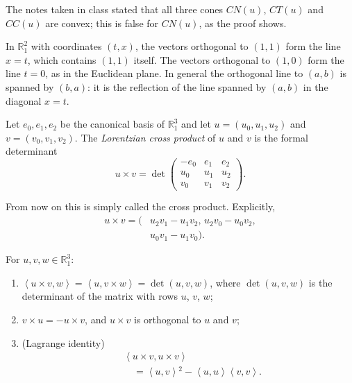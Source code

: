 The notes taken in class stated that all
three cones $CN(u)$, $CT(u)$ and $CC(u)$
are convex; this is false for $CN(u)$, as
the proof shows.

\begin{example}
\label{example-palmas-orthogonal-plane}
In $\mathbb{R}^2_1$ with coordinates
$(t,x)$, the vectors orthogonal to
$(1,1)$ form the line $x=t$, which
contains $(1,1)$ itself. The vectors
orthogonal to $(1,0)$ form the line $t=0$,
as in the Euclidean plane. In general the
orthogonal line to $(a,b)$ is spanned by
$(b,a)$: it is the reflection of the line
spanned by $(a,b)$ in the diagonal $x=t$.
\end{example}

\begin{definition}
\label{definition-palmas-cross-product}
Let $e_0,e_1,e_2$ be the canonical basis of
$\mathbb{R}^3_1$ and let
$u=(u_0,u_1,u_2)$ and $v=(v_0,v_1,v_2)$.
The \emph{Lorentzian cross product} of $u$
and $v$ is the formal determinant
$$
u\times v=\det
\begin{pmatrix}
-e_0 & e_1 & e_2\\
u_0 & u_1 & u_2\\
v_0 & v_1 & v_2
\end{pmatrix}.
$$
\end{definition}

From now on this is simply called the
cross product. Explicitly,
$$
\begin{aligned}
u\times v=\big(
&u_2v_1-u_1v_2,\,
u_2v_0-u_0v_2,\\
&u_0v_1-u_1v_0\big).
\end{aligned}
$$

\begin{proposition}
\label{proposition-palmas-cross-product}
For $u,v,w\in\mathbb{R}^3_1$:
\begin{enumerate}
\item
$\left\langle{} u\times v,w \right\rangle{}
=\left\langle{} u,v\times w \right\rangle{}
=\det(u,v,w)$, where $\det(u,v,w)$ is the
determinant of the matrix with rows $u$,
$v$, $w$;
\item $v\times u=-u\times v$, and
$u\times v$ is orthogonal to $u$ and $v$;
\item (Lagrange identity)
$$
\begin{aligned}
&\left\langle{} u\times v,u\times v
\right\rangle{}\\
&\quad=\left\langle{} u,v \right\rangle{}^2
-\left\langle{} u,u \right\rangle{}
\left\langle{} v,v \right\rangle{}.
\end{aligned}
$$
\end{enumerate}
\end{proposition}

